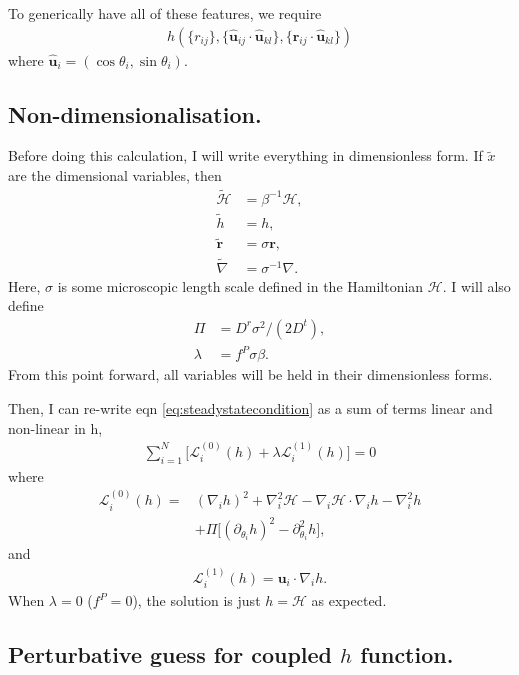 \documentclass[twocolumn,amsmath,amssymb,aps]{revtex4-1}%
\begin{document}
To generically have all of these features, we require
\begin{align}
  h(\{r_{ij}\},\{\bm{\hat{u}}_{ij}\cdot\bm{\hat{u}}_{kl}\},
  \{\bm{r}_{ij}\cdot\bm{\hat{u}}_{kl}\})
\end{align}
where $\bm{\hat{u}}_i = (\cos\theta_i,\sin\theta_i)$.

\subsection{Non-dimensionalisation.}

Before doing this calculation, I will write everything in dimensionless form.
If $\tilde{x}$ are the dimensional variables, then
\begin{align}
  \tilde{\mathcal{H}} &= \beta^{-1}\mathcal{H},\\
  \tilde{h} &= h,\\
  \tilde{\bm{r}} &= \sigma\bm{r},\\
  \tilde{\nabla} &= \sigma^{-1}\nabla.
\end{align}
Here, $\sigma$ is some microscopic length scale defined in the Hamiltonian
$\mathcal{H}$. I will also define
\begin{align}
  \Pi &= D^r\sigma^2/(2D^t),\\
  \lambda &= f^P\sigma\beta.
\end{align}
From this point forward, all variables will be held in their dimensionless
forms.


Then, I can re-write eqn \ref{eq:steadystatecondition} as a sum of terms
linear and non-linear in $\mathrm{h}$,
\begin{align}\label{eq:dim_ss}
  \sum_{i=1}^N\big[\mathcal{L}_i^{(0)}(h)
    +\lambda\mathcal{L}_i^{(1)}(h)\big] = 0
\end{align}
where
\begin{align}
  \mathcal{L}_i^{(0)}(h)=&(\nabla_i h)^2 + \nabla_i^2\mathcal{H}
  -\nabla_i\mathcal{H}\cdot\nabla_ih-\nabla_i^2h\nonumber\\
  &+\Pi\big[(\partial_{\theta_i}h)^2-\partial_{\theta_i}^2h\big],
\end{align}
and
\begin{align}
  \mathcal{L}_i^{(1)}(h)=\bm{u}_i\cdot\nabla_ih.
\end{align}
When $\lambda = 0$ ($f^P=0$), the solution is just $h=\mathcal{H}$ as expected.

\subsection{Perturbative guess for coupled $h$ function.}
\end{document}
